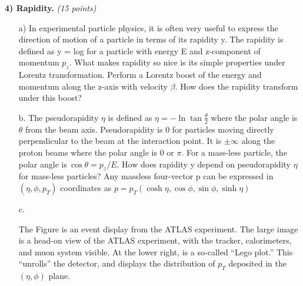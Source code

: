 {\vspace*{0.25in}

\textbf{4) Rapidity.} \hfill \textit{(15 points)}\\

\begin{itemize}
\item[a)]{
In experimental particle physics, it is often very useful to express the direction of motion of a particle in terms of its rapidity y. The rapidity is defined as
\be
y =  log 
\ee
for a particle with energy E and z-component of momentum $p_z$. 
What makes rapidity so nice is its simple properties under Lorentz transformation. 
Perform a Lorentz boost of the energy and momentum along the z-axis with velocity $\beta$. 
How does the rapidity transform under this boost? 
}
\item[b.]{
The pseudorapidity $\eta$ is defined as $\eta = - \ln \tan \frac{\theta}{2}$ where the polar angle is $\theta$ from the beam axis.
Pseudorapidity is 0 for particles moving directly perpendicular to the beam at the interaction point. It is $\pm \infty$ along the proton beams where the polar angle is $0$ or $\pi$. 
For a mass-less particle,  the polar angle is$\ \cos \theta = p_z/E$.
How does rapidity y depend on pseudorapidity $\eta$ for mass-less particles?
Any massless four-vector p can be expressed in $(\eta, \phi, p_T)$ coordinates as $p = p_T(\cosh \eta, \cos \phi,  \sin \phi, \sinh \eta)$
}
\item[c.]{

The Figure is an event display from the ATLAS experiment. 
The large image is a head-on view of the ATLAS experiment, with the tracker, calorimeters, and muon system visible. 
At the lower right, is a so-called “Lego plot.” 
This “unrolls” the detector, and displays the distribution of $p_T$ deposited in the $(\eta, \phi)$ plane.

}
\end{itemize}}
